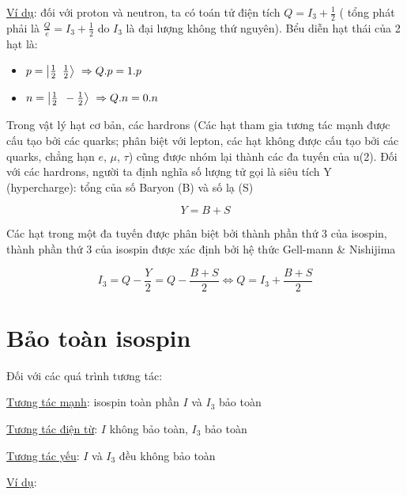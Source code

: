 \documentclass{report}
\begin{document}
\underline{Ví dụ}: đối với proton và neutron, ta có toán tử điện tích \( Q = I_{3} + \frac{1}{2} \) ( tổng phát phải là \( \frac{Q}{e} = I_{3} + \frac{1}{2} \) do \(I_{3}\) là đại lượng không thứ nguyên). Bểu diễn hạt thái của 2 hạt là:

	\begin{itemize}
		\item \( p = \left| \frac{1}{2} \enskip \frac{1}{2} \right\rangle\ \Rightarrow Q.p = 1.p \)
		\item \( n = \left| \frac{1}{2} \enskip - \frac{1}{2} \right\rangle\ \Rightarrow Q.n = 0.n \)
	\end{itemize}
	
Trong vật lý hạt cơ bản, các hardrons (Các hạt tham gia tương tác mạnh được cấu tạo bởi các quarks; phân biệt với lepton, các hạt không được cấu tạo bởi các quarks, chẳng hạn \(e\), \(\mu\), \(\tau\))	cũng được nhóm lại thành các đa tuyến của u(2). Đối với các hardrons, người ta định nghĩa số lượng tử gọi là siêu tích Y (hypercharge): tổng của số Baryon (B) và số lạ (S) 

\[ Y = B + S \]

Các hạt trong một đa tuyến được phân biệt bởi thành phần thứ 3 của isospin, thành phần thứ 3 của isospin được xác định bởi hệ thức Gell-mann \& Nishijima

\[ I_{3} = Q - \frac{Y}{2} = Q - \frac{B + S}{2} \Leftrightarrow Q = I_{3} + \frac{B + S}{2} \]

\section{Bảo toàn isospin}

Đối với các quá trình tương tác:

\underline{Tương tác mạnh}: isospin toàn phần \( I\) và \(I_{3}\) bảo toàn

\underline{Tương tác điện từ}: \(I\) không bảo toàn, \(I_{3}\) bảo toàn

\underline{Tương tác yếu}: \(I\) và \(I_{3}\) đều không bảo toàn

\underline{Ví dụ}: 
\end{document}

